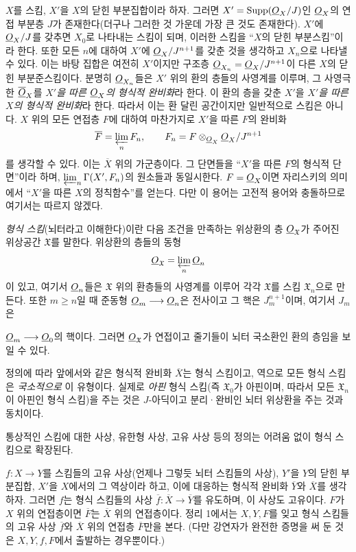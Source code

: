 $X$를 스킴, $X'$을 $X$의 닫힌 부분집합이라 하자. 그러면
$X'=\operatorname{Supp}(\underline{O}_X/J)$인 $\underline{O}_X$의 연접 부분층 $J$가
존재한다(더구나 그러한 것 가운데 가장 큰 것도 존재한다). $X'$에
$\underline{O}_X/J$를 갖추면 $X_0$로 나타내는 스킴이 되며, 이러한 스킴을
``$X$의 닫힌 부분스킴''이라 한다. 또한 모든 $n$에 대하여 $X'$에
$\underline{O}_X/J^{n+1}$를 갖춘 것을 생각하고 $X_n$으로 나타낼 수 있다. 이는
바탕 집합은 여전히 $X'$이지만 구조층
$\underline{O}_{X_n}=\underline{O}_X/J^{n+1}$이 다른 $X$의 닫힌 부분준스킴이다. 분명히
$\underline{O}_{X_n}$들은 $X'$ 위의 환의 층들의 사영계를 이루며, 그 사영극한
$\overline{\underline{O}}_X$를 \emph{$X'$을 따른 $\underline{O}_X$의 형식적 완비화}라
한다. 이 환의 층을 갖춘 $X'$을 \emph{$X'$을 따른 $X$의 형식적
완비화}라 한다. 따라서 이는 환 달린 공간이지만 일반적으로 스킴은 아니다.
$X$ 위의 모든 연접층 $F$에 대하여 마찬가지로 $X'$을 따른 $F$의 완비화
\[
\overline F=\varprojlim_n F_n,
\qquad F_n=F\otimes_{\underline{O}_X}\underline{O}_X/J^{n+1}
\]
를 생각할 수 있다. 이는 $\overline X$ 위의 가군층이다. 그 단면들을
``$X'$을 따른 $F$의 형식적 단면''이라 하며,
$\varprojlim_n\Gamma(X',F_n)$의 원소들과 동일시한다. $F=\underline{O}_X$이면
자리스키의 의미에서 ``$X'$을 따른 $X$의 정칙함수''를 얻는다. 다만 이
용어는 고전적 용어와 충돌하므로 여기서는 따르지 않겠다.

\emph{형식 스킴}(뇌터라고 이해한다)이란 다음 조건을 만족하는 위상환의 층
$\underline{O}_{\mathfrak X}$가 주어진 위상공간 $\mathfrak X$를 말한다. 위상환의
층들의 동형
\[
\underline{O}_{\mathfrak X}=\varprojlim_n\underline{O}_n
\]
이 있고, 여기서 $\underline{O}_n$들은 $\mathfrak X$ 위의 환층들의 사영계를
이루어 각각 $\mathfrak X$를 스킴 $\mathfrak X_n$으로 만든다. 또한
$m\geq n$일 때 준동형 $\underline{O}_m\longrightarrow\underline{O}_n$은 전사이고 그 핵은
$J_m^{n+1}$이며, 여기서 $J_m$은

$\underline{O}_m\longrightarrow\underline{O}_0$의 핵이다. 그러면 $\underline{O}_{\mathfrak X}$가
연접이고 줄기들이 뇌터 국소환인 환의 층임을 보일 수 있다.

정의에 따라 앞에서와 같은 형식적 완비화 $\overline X$는 형식 스킴이고,
역으로 모든 형식 스킴은 \emph{국소적으로} 이 유형이다. 실제로 \emph{아핀}
형식 스킴(즉 $\mathfrak X_0$가 아핀이며, 따라서 모든 $\mathfrak X_n$이
아핀인 형식 스킴)을 주는 것은 $J$-아딕이고 분리·완비인 뇌터 위상환을
주는 것과 동치이다.

통상적인 스킴에 대한 사상, 유한형 사상, 고유 사상 등의 정의는 어려움
없이 형식 스킴으로 확장된다.


$f:X\longrightarrow Y$를 스킴들의 고유 사상(언제나 그렇듯 뇌터
스킴들의 사상), $Y'$을 $Y$의 닫힌 부분집합, $X'$을 $X$에서의 그
역상이라 하고, 이에 대응하는 형식적 완비화 $\overline Y$와
$\overline X$를 생각하자. 그러면 $f$는 형식 스킴들의 사상
$\overline f:\overline X\longrightarrow\overline Y$를 유도하며, 이
사상도 고유이다. $F$가 $X$ 위의 연접층이면 $\overline F$는
$\overline X$ 위의 연접층이다. 정리 1에서는 $X,Y,F$를 잊고 형식
스킴들의 고유 사상 $\overline f$와 $\overline X$ 위의 연접층
$\overline F$만을 본다. (다만 강연자가 완전한 증명을 써 둔 것은
$X,Y,f,F$에서 출발하는 경우뿐이다.)


